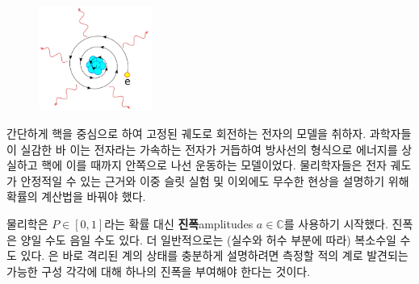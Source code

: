 \documentclass[a4paper,chapter,kosection,atbegshi,hidelinks,itemph]{oblivoir}
\begin{document}
\begin{figure}
    \centering
    \includegraphics[width=0.33\textwidth]{iqis1_008}
\end{figure}

간단하게 핵을 중심으로 하여 고정된 궤도로 회전하는 전자의 모델을 취하자.
과학자들이 실감한 바 이는 전자라는 가속하는 전자가 거듭하여 방사선의
형식으로 에너지를 상실하고 핵에 이를 때까지 안쪽으로 나선 운동하는 모델이었다.
물리학자들은 전자 궤도가 안정적일 수 있는 근거와 이중 슬릿 실험 및 이외에도
무수한 현상을 설명하기 위해 확률의 계산법을 바꿔야 했다. 

물리학은 $P\in[0,1]$라는 확률 대신 \textbf{진폭}{\footnotesize amplitudes}
$a\in\mathbb{C}$를 사용하기 시작했다. 진폭은 양일 수도 음일 수도 있다. 더
일반적으로는 (실수와 허수 부분에 따라) 복소수일 수도 있다. 은 바로 격리된 계의 상태를 충분하게 설명하려면 측정할 적의 계로
발견되는 가능한 구성 각각에 대해 하나의 진폭을 부여해야 한다는 것이다.
\end{document}
